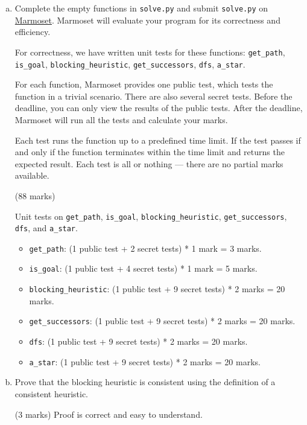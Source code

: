 \documentclass[12pt]{article}
\begin{document}
\begin{enumerate}[(a)]

\item Complete the empty functions in \verb+solve.py+ and submit \verb+solve.py+ on \href{https://marmoset.student.cs.uwaterloo.ca/}{Marmoset}. Marmoset will evaluate your program for its correctness and efficiency.

For correctness, we have written unit tests for these functions: \verb+get_path+, \verb+is_goal+, \verb+blocking_heuristic+, \verb+get_successors+, \verb+dfs+, \verb+a_star+.

For each function, Marmoset provides one public test, which tests the function in a trivial scenario. There are also several secret tests. Before the deadline, you can only view the results of the public tests. After the deadline, Marmoset will run all the tests and calculate your marks.

Each test runs the function up to a predefined time limit. If the test passes if and only if the function terminates within the time limit and returns the expected result. Each test is all or nothing --- there are no partial marks available.

\begin{markscheme}
(88 marks) 

Unit tests on \verb+get_path+, \verb+is_goal+, \verb+blocking_heuristic+, \verb+get_successors+, \verb+dfs+, and \verb+a_star+. 

\begin{itemize}
\item \verb+get_path+: (1 public test + 2 secret tests) * 1 mark = 3 marks.
\item \verb+is_goal+:  (1 public test + 4 secret tests) * 1 mark = 5 marks.
\item \verb+blocking_heuristic+: (1 public test + 9 secret tests) * 2 marks = 20 marks.
\item \verb+get_successors+: (1 public test + 9 secret tests) * 2 marks = 20 marks.
\item \verb+dfs+:    (1 public test + 9 secret tests) * 2 marks = 20 marks.
\item \verb+a_star+: (1 public test + 9 secret tests) * 2 marks = 20 marks.
\end{itemize}

\end{markscheme}
  
\item Prove that the blocking heuristic is consistent using the definition of a consistent heuristic. 
\begin{markscheme}
(3 marks) Proof is correct and easy to understand. 
\end{markscheme}


\end{enumerate}
\end{document}
